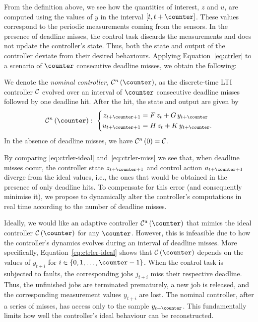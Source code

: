From the definition above, we see how the quantities of interest, $z$ and $u$, are computed using the values of $y$ in the interval $\left[ t, t+\counter \right]$. 
These values correspond to the periodic measurements coming from the sensors.
%
In the presence of deadline misses, the control task discards the measurements and does not update the controller's state.
Thus, both the state and output of the controller deviate from their desired behaviours. 
Applying Equation~\eqref{eq:ctrler} to a scenario of $\counter$ consecutive deadline misses, we obtain the following:

\begin{definition}%
    We denote the \emph{nominal controller}, $\ctrler^n\funof{\counter}$, as the discrete-time LTI controller $\mathcal{C}$ evolved over an interval of $\counter$ consecutive deadline misses followed by one deadline hit. 
    After the hit, the state and output are given by
    \begin{equation}
        \label{eq:ctrler-miss}
        \ctrler^n\funof{\counter}:\,\, 
        \left\{\begin{aligned}
            z_{t+\counter+1} &= \Ac\,z_{t} + \Bc\,y_{t+\counter}\\
            u_{t+\counter+1} &= \Cc\,z_{t} + \Dc\,y_{t+\counter}.
        \end{aligned}\right.
    \end{equation}
    In the absence of deadline misses, we have $\mathcal{C}^n\left( 0 \right) = \mathcal{C}$.
\end{definition}

By comparing \eqref{eq:ctrler-ideal} and~\eqref{eq:ctrler-miss} we see that, when deadline misses occur, the controller state $z_{t+\counter+1}$ and control action $u_{t+\counter+1}$ diverge from the ideal values, i.e., the ones that would be obtained in the presence of only deadline hits. 
To compensate for this error (and consequently minimise it), we propose to dynamically alter the controller's computations in real time according to the number of deadline misses. 

Ideally, we would like an adaptive controller $\ctrler^a\funof{\counter}$ that mimics the ideal controller $\ctrler\funof{\counter}$ for any $\counter$.
However, this is infeasible due to how the controller's dynamics evolves during an interval of deadline misses.
More specifically, Equation~\eqref{eq:ctrler-ideal} shows that $\ctrler\funof{\counter}$ depends on the values of $y_{t+i}$ for $i \in \left\{ 0, 1, \ldots, \counter-1 \right\}$.
When the control task is subjected to faults, the corresponding jobs $j_{t+i}$ miss their respective deadline. 
Thus, the unfinished jobs are terminated prematurely, a new job is released, and the corresponding measurement values $y_{t+i}$ are lost.
The nominal controller, after a series of misses, has access only to the sample $y_{t+\counter}$.
This fundamentally limits how well the controller's ideal behaviour can be reconstructed.

